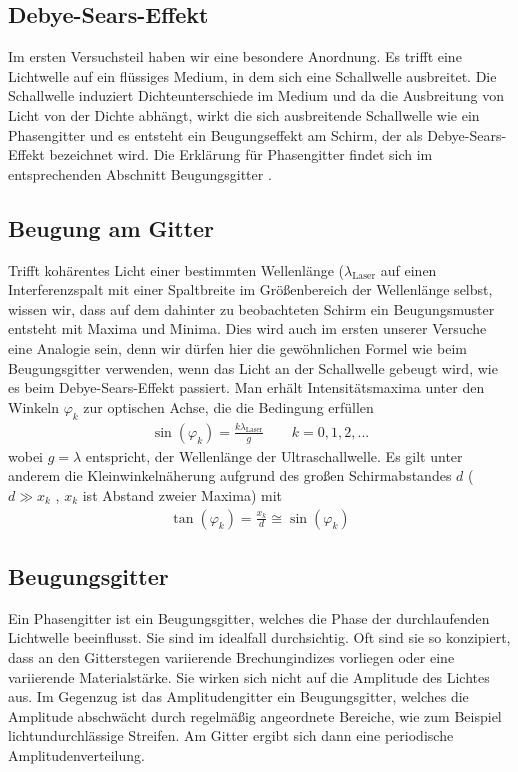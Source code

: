 \documentclass[a4paper, 12pt]{scrartcl}
\begin{document}
\subsection{Debye-Sears-Effekt} 
Im ersten Versuchsteil haben wir eine besondere Anordnung. Es trifft eine Lichtwelle auf ein flüssiges Medium, in dem sich eine Schallwelle ausbreitet. Die Schallwelle induziert Dichteunterschiede im Medium und da die Ausbreitung von Licht von der Dichte abhängt, wirkt die sich ausbreitende Schallwelle wie ein Phasengitter und es entsteht ein Beugungseffekt am Schirm, der als Debye-Sears-Effekt bezeichnet wird. Die Erklärung für Phasengitter findet sich im entsprechenden Abschnitt \glqq Beugungsgitter \grqq .
\subsection{Beugung am Gitter}
Trifft kohärentes Licht einer bestimmten Wellenlänge ($\lambda_\text{Laser}$ auf einen Interferenzspalt mit einer Spaltbreite im Größenbereich der Wellenlänge selbst, wissen wir, dass auf dem dahinter zu beobachteten Schirm ein Beugungsmuster entsteht mit Maxima und Minima. Dies wird auch im ersten unserer Versuche eine Analogie sein, denn wir dürfen hier die gewöhnlichen Formel wie beim Beugungsgitter verwenden, wenn das Licht an der Schallwelle gebeugt wird, wie es beim Debye-Sears-Effekt passiert. Man erhält Intensitätsmaxima unter den Winkeln $\varphi_k$ zur optischen Achse, die die Bedingung erfüllen
\begin{align}
\sin(\varphi_k) = \frac{k \lambda_{\textrm{Laser}}}{g} \qquad k=0,1,2,...
\end{align}
wobei $g = \lambda$ entspricht, der Wellenlänge der Ultraschallwelle. Es gilt unter anderem die Kleinwinkelnäherung aufgrund des großen Schirmabstandes $d$ ($d\gg x_k$ , $x_k$ ist Abstand zweier Maxima) mit 
\begin{align}
\tan(\varphi_k) = \frac{x_k}{d} \cong \sin(\varphi_k)
\end{align}
\subsection{Beugungsgitter}
Ein Phasengitter ist ein Beugungsgitter, welches die Phase der durchlaufenden Lichtwelle beeinflusst. Sie sind im idealfall durchsichtig. Oft sind sie so konzipiert, dass an den Gitterstegen variierende Brechungindizes vorliegen oder eine variierende Materialstärke. Sie wirken sich nicht auf die Amplitude des Lichtes aus. \newline
\newline 
Im Gegenzug ist das Amplitudengitter ein Beugungsgitter, welches die Amplitude abschwächt durch regelmäßig angeordnete Bereiche, wie zum Beispiel lichtundurchlässige Streifen. Am Gitter ergibt sich dann eine periodische Amplitudenverteilung.   
\end{document}
